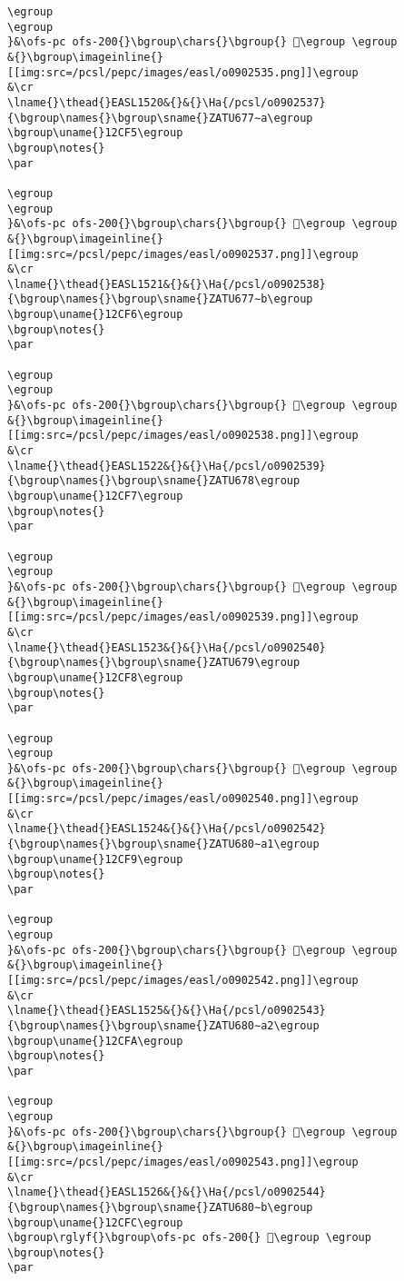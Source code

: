 \begin{verbatim}
\egroup
\egroup
}&\ofs-pc ofs-200{}\bgroup\chars{}\bgroup{} 𒳴\egroup \egroup
&{}\bgroup\imageinline{}[[img:src=/pcsl/pepc/images/easl/o0902535.png]]\egroup
&\cr
\lname{}\thead{}EASL1520&{}&{}\Ha{/pcsl/o0902537}{\bgroup\names{}\bgroup\sname{}ZATU677∼a\egroup
\bgroup\uname{}12CF5\egroup
\bgroup\notes{}
\par 

\egroup
\egroup
}&\ofs-pc ofs-200{}\bgroup\chars{}\bgroup{} 𒳵\egroup \egroup
&{}\bgroup\imageinline{}[[img:src=/pcsl/pepc/images/easl/o0902537.png]]\egroup
&\cr
\lname{}\thead{}EASL1521&{}&{}\Ha{/pcsl/o0902538}{\bgroup\names{}\bgroup\sname{}ZATU677∼b\egroup
\bgroup\uname{}12CF6\egroup
\bgroup\notes{}
\par 

\egroup
\egroup
}&\ofs-pc ofs-200{}\bgroup\chars{}\bgroup{} 𒳶\egroup \egroup
&{}\bgroup\imageinline{}[[img:src=/pcsl/pepc/images/easl/o0902538.png]]\egroup
&\cr
\lname{}\thead{}EASL1522&{}&{}\Ha{/pcsl/o0902539}{\bgroup\names{}\bgroup\sname{}ZATU678\egroup
\bgroup\uname{}12CF7\egroup
\bgroup\notes{}
\par 

\egroup
\egroup
}&\ofs-pc ofs-200{}\bgroup\chars{}\bgroup{} 𒳷\egroup \egroup
&{}\bgroup\imageinline{}[[img:src=/pcsl/pepc/images/easl/o0902539.png]]\egroup
&\cr
\lname{}\thead{}EASL1523&{}&{}\Ha{/pcsl/o0902540}{\bgroup\names{}\bgroup\sname{}ZATU679\egroup
\bgroup\uname{}12CF8\egroup
\bgroup\notes{}
\par 

\egroup
\egroup
}&\ofs-pc ofs-200{}\bgroup\chars{}\bgroup{} 𒳸\egroup \egroup
&{}\bgroup\imageinline{}[[img:src=/pcsl/pepc/images/easl/o0902540.png]]\egroup
&\cr
\lname{}\thead{}EASL1524&{}&{}\Ha{/pcsl/o0902542}{\bgroup\names{}\bgroup\sname{}ZATU680∼a1\egroup
\bgroup\uname{}12CF9\egroup
\bgroup\notes{}
\par 

\egroup
\egroup
}&\ofs-pc ofs-200{}\bgroup\chars{}\bgroup{} 𒳹\egroup \egroup
&{}\bgroup\imageinline{}[[img:src=/pcsl/pepc/images/easl/o0902542.png]]\egroup
&\cr
\lname{}\thead{}EASL1525&{}&{}\Ha{/pcsl/o0902543}{\bgroup\names{}\bgroup\sname{}ZATU680∼a2\egroup
\bgroup\uname{}12CFA\egroup
\bgroup\notes{}
\par 

\egroup
\egroup
}&\ofs-pc ofs-200{}\bgroup\chars{}\bgroup{} 𒳺\egroup \egroup
&{}\bgroup\imageinline{}[[img:src=/pcsl/pepc/images/easl/o0902543.png]]\egroup
&\cr
\lname{}\thead{}EASL1526&{}&{}\Ha{/pcsl/o0902544}{\bgroup\names{}\bgroup\sname{}ZATU680∼b\egroup
\bgroup\uname{}12CFC\egroup
\bgroup\rglyf{}\bgroup\ofs-pc ofs-200{} 𒳼\egroup \egroup
\bgroup\notes{}
\par 


\end{verbatim}
